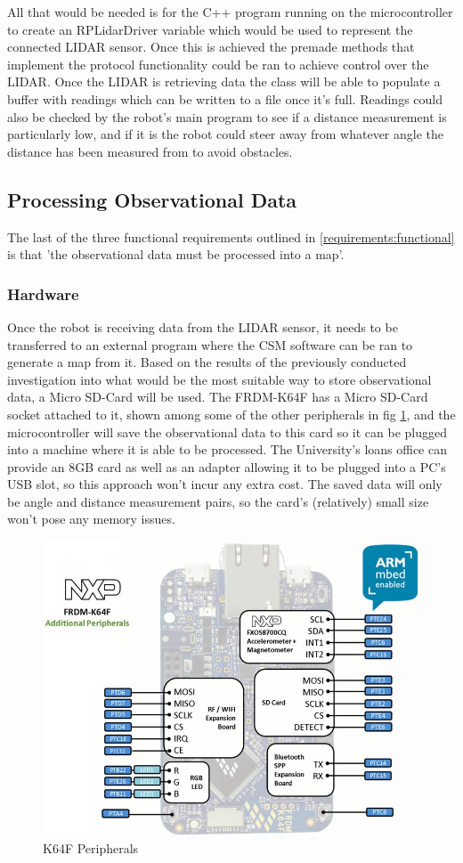 				All that would be needed is for the C++ program running on the microcontroller to create an RPLidarDriver variable which would be used to represent the connected LIDAR sensor. Once this is achieved the premade methods that implement the protocol functionality could be ran to achieve control over the LIDAR. Once the LIDAR is retrieving data the class will be able to populate a buffer with readings which can be written to a file once it's full. Readings could also be checked by the robot's main program to see if a distance measurement is particularly low, and if it is the robot could steer away from whatever angle the distance has been measured from to avoid obstacles.
				
			\subsection{Processing Observational Data}
			\label{section:processing:intro}
			The last of the three functional requirements outlined in \ref{requirements:functional} is that 'the observational data must be processed into a map'.
				\subsubsection{Hardware}
				Once the robot is receiving data from the LIDAR sensor, it needs to be transferred to an external program where the CSM software can be ran to generate a map from it. Based on the results of the previously conducted investigation into what would be the most suitable way to store observational data, a Micro SD-Card will be used. The FRDM-K64F has a Micro SD-Card socket attached to it, shown among some of the other peripherals in fig \ref{fig:k64fperipherals}, and the microcontroller will save the observational data to this card so it can be plugged into a machine where it is able to be processed. The University's loans office can provide an 8GB card as well as an adapter allowing it to be plugged into a PC's USB slot, so this approach won't incur any extra cost. The saved data will only be angle and distance measurement pairs, so the card's (relatively) small size won't pose any memory issues. 
				
				\begin{figure}[h]
					\centering
					\includegraphics[width=.6\linewidth]{SYNTHESIS/k64fperipherals.png}
					\caption{K64F Peripherals}
					\label{fig:k64fperipherals}
				\end{figure}				
				
